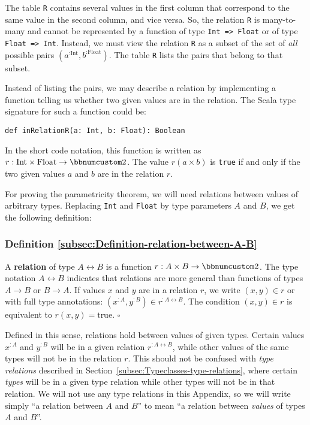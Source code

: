 The table \lstinline!R! contains several values in the first column
that correspond to the same value in the second column, and vice versa.
So, the relation \lstinline!R! is many-to-many and cannot be represented
by a function of type \lstinline!Int => Float! or of type \lstinline!Float => Int!.
Instead, we must view the relation \lstinline!R! as a subset of the
set of \emph{all} possible pairs $(a^{:\text{Int}},b^{:\text{Float}})$.
The table \lstinline!R! lists the pairs that belong to that subset.

Instead of listing the pairs, we may describe a relation by implementing
a function telling us whether two given values are in the relation.
The Scala type signature for such a function could be:
\begin{lstlisting}
def inRelationR(a: Int, b: Float): Boolean
\end{lstlisting}
In the short code notation, this function is written as $r:\text{Int}\times\text{Float}\rightarrow\bbnum 2$.
The value $r(a\times b)$ is \lstinline!true! if and only if the
two given values $a$ and $b$ are in the relation $r$.

For proving the parametricity theorem, we will need relations between
values of arbitrary types. Replacing \lstinline!Int! and \lstinline!Float!
by type parameters $A$ and $B$, we get the following definition:

\subsubsection{Definition \label{subsec:Definition-relation-between-A-B}\ref{subsec:Definition-relation-between-A-B}}

A \textbf{relation} of
type $A\leftrightarrow B$ is a function $r:A\times B\rightarrow\bbnum 2$.
The type notation $A\leftrightarrow B$ indicates that relations are
more general than functions of types $A\rightarrow B$ or $B\rightarrow A$.
If values $x$ and $y$ are in a relation $r$, we write $(x,y)\in r$
or with full type annotations: $(x^{:A},y^{:B})\in r^{:A\leftrightarrow B}$.
The condition $(x,y)\in r$ is equivalent to $r(x,y)=\text{true}$.
$\square$

Defined in this sense, relations hold between values of given types.
Certain values $x^{:A}$ and $y^{:B}$ will be in a given relation
$r^{:A\leftrightarrow B}$, while other values of the same types will
not be in the relation $r$. This should not be confused with \emph{type
relations} described in Section~\ref{subsec:Typeclasses-type-relations},
where certain \emph{types} will be in a given type relation while
other types will not be in that relation. We will not use any type
relations in this Appendix, so we will write simply \textsf{``}a relation
between $A$ and $B$\textsf{''} to mean \textsf{``}a relation between \emph{values}
of types $A$ and $B$\textsf{''}.

